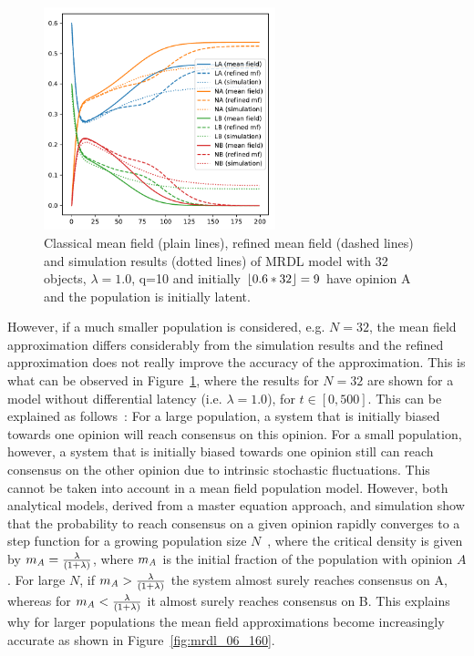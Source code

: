 \documentclass{elsarticle}
\begin{document}
\begin{figure}[ht]
  \begin{center}
    \includegraphics[width=0.6\textwidth]{MajorityRule_all_N32}
\end{center}
\caption{\label{fig:mrdl_06_32} Classical mean field (plain lines),
  refined mean field (dashed lines) and simulation results (dotted
  lines) of MRDL model with 32 objects, $\lambda=1.0$, q=10 and
  initially $\left\lfloor0.6*32\right\rfloor=9$ have opinion A and the population is
  initially latent. }
\end{figure}

However, if a much smaller population is considered, e.g. $N=32$, the
mean field approximation differs considerably from the simulation
results and the refined approximation does not really improve the
accuracy of the approximation. This is what can be observed in
Figure~\ref{fig:mrdl_06_32}, where the results for $N=32$ are shown for a
model without differential latency (i.e. $\lambda=1.0$), for $t\in [0,500]$.  This can be
explained as follows~: For a large population, a system that is
initially biased towards one opinion will reach consensus on this
opinion. For a small population, however, a system that is initially
biased towards one opinion still can reach consensus on the other
opinion due to intrinsic stochastic fluctuations. This cannot be
taken into account in a mean field population model.  However, both
analytical models, derived from a master equation approach, and
simulation show that the probability to reach consensus on a given
opinion rapidly converges to a step function for a growing population
size $N$~\cite{Sch11}, where the critical density is given by
$m_{\mathit{A}}=\frac{\lambda}{(1+\lambda)}$, where $m_{\mathit{A}}$ is the initial
fraction of the population with opinion $A$. For large $N$, if
$m_{\mathit{A}}>\frac{\lambda}{(1+\lambda)}$ the system almost surely reaches
consensus on A, whereas for $m_{\mathit{A}}<\frac{\lambda}{(1+\lambda)}$ it
almost surely reaches consensus on B.  This explains why for larger
populations the mean field approximations become increasingly accurate
as shown in Figure~\ref{fig:mrdl_06_160}.
\end{document}
